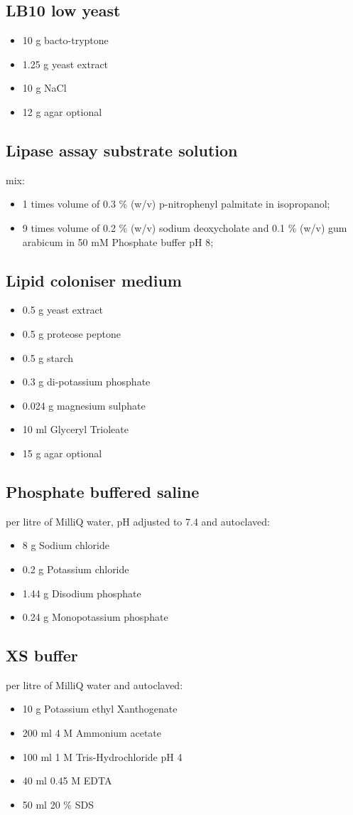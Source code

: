 \documentclass[11pt]{article}
\begin{document}
\subsection{LB10 low yeast}
\begin{itemize}
\item 10 g bacto-tryptone
\item 1.25 g yeast extract
\item 10 g NaCl
\item 12 g agar optional
\end{itemize}

\subsection{Lipase assay substrate solution}
mix:
\begin{itemize}
\item 1 times volume of 0.3 \% (w/v) p-nitrophenyl palmitate in isopropanol;
\item 9 times volume of 0.2 \% (w/v) sodium deoxycholate and 0.1 \% (w/v) gum arabicum in 50 mM Phosphate buffer pH 8;
\end{itemize}

\subsection{Lipid coloniser medium}
\begin{itemize}
\item 0.5 g yeast extract
\item 0.5 g proteose peptone
\item 0.5 g starch
\item 0.3 g di-potassium phosphate
\item 0.024 g magnesium sulphate
\item 10 ml Glyceryl Trioleate
\item 15 g agar optional
\end{itemize}

\subsection{Phosphate buffered saline}
per litre of MilliQ water, pH adjusted to 7.4 and autoclaved:
\begin{itemize}
\item 8 g Sodium chloride
\item 0.2 g Potassium chloride
\item 1.44 g Disodium phosphate
\item 0.24 g Monopotassium phosphate
\end{itemize}

\subsection{XS buffer}
per litre of MilliQ water and autoclaved:
\begin{itemize}
\item 10 g Potassium ethyl Xanthogenate
\item 200 ml 4 M Ammonium acetate
\item 100 ml 1 M Tris-Hydrochloride pH 4
\item 40 ml 0.45 M EDTA
\item 50 ml 20 \% SDS
 
\end{itemize}
\end{document}
